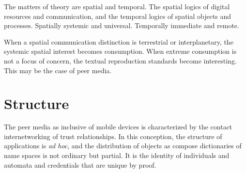 \documentclass[12pt,twocolumn]{article}
\begin{document}
The matters of theory are spatial and temporal.  The spatial logics of
digital resources and communication, and the temporal logics of
spatial objects and processes.  Spatially systemic and universal.
Temporally immediate and remote.

When a spatial communication distinction is terrestrial or
interplanetary, the systemic spatial interest becomes consumption.
When extreme consumption is not a focus of concern, the textual
reproduction standards become interesting.  This may be the case of
peer media.

\section{Structure}

The peer media as inclusive of mobile devices is characterized by the
contact internetworking of trust relationships.  In this conception,
the structure of applications is {\it ad hoc}, and the distribution of
objects as compose dictionaries of name spaces is not ordinary but
partial.  It is the identity of individuals and automata and
credentials that are unique by proof.



%
%
%
%
\end{document}
